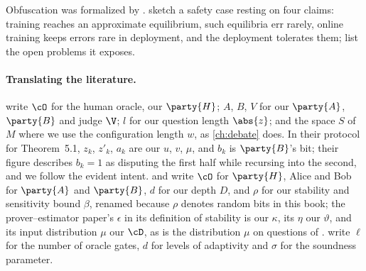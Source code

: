 \begin{refsection}
Obfuscation was formalized by \textcite{BrownCohenIrving2024}. \Textcite{BuhlEtAl2025} sketch a safety case resting on four claims: training reaches an approximate equilibrium, such equilibria err rarely, online training keeps errors rare in deployment, and the deployment tolerates them; \textcite{HiltonEtAl2025} list the open problems it exposes.

\paragraph{Translating the literature.} \Textcite{BrownCohenEtAl2024} write $\cO$ for the human oracle, our $\party{H}$; $A$, $B$, $V$ for our $\party{A}$, $\party{B}$ and judge $\V$; $l$ for our question length $\abs{z}$; and the space $S$ of $M$ where we use the configuration length $w$, as \cref{ch:debate} does. In their protocol for Theorem~5.1, $z_k$, $z'_k$, $a_k$ are our $u$, $v$, $\mu$, and $b_k$ is $\party{B}$'s bit; their figure describes $b_k=1$ as disputing the first half while recursing into the second, and we follow the evident intent. \Textcite{BrownCohenEtAl2026} and \textcite{LiEtAl2026} write $\cO$ for $\party{H}$, Alice and Bob for $\party{A}$ and $\party{B}$, $d$ for our depth $D$, and $\rho$ for our stability and sensitivity bound $\beta$, renamed because $\rho$ denotes random bits in this book; the prover--estimator paper's $\epsilon$ in its definition of stability is our $\kappa$, its $\eta$ our $\vartheta$, and its input distribution $\mu$ our $\cD$, as is the distribution $\mu$ on questions of \textcite{Irving2025}. \Textcite{ChenKalaiXi2026} write $\ell$ for the number of oracle gates, $d$ for levels of adaptivity and $\sigma$ for the soundness parameter.

\printchapterbib
\end{refsection}
